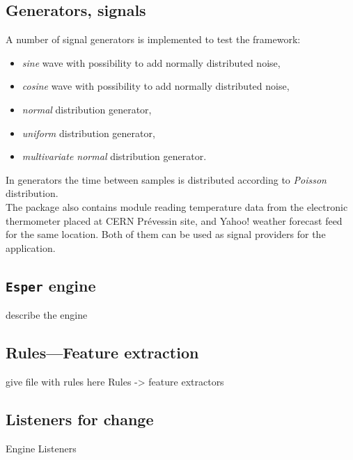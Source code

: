 \documentclass[11pt, letterpaper]{article}            %
\begin{document}
\subsection{Generators, signals}
A number of signal generators is implemented to test the framework:
\begin{itemize}
	\item \emph{sine} wave with possibility to add normally distributed noise,
	\item \emph{cosine} wave with possibility to add normally distributed noise,
	\item \emph{normal} distribution generator,
	\item \emph{uniform} distribution generator,
	\item \emph{multivariate normal} distribution generator.
\end{itemize}
In generators the time between samples is distributed according to \emph{Poisson} distribution.\\

The package also contains module reading temperature data from the electronic thermometer placed at CERN Prévessin site, and Yahoo! weather forecast feed for the same location. Both of them can be used as signal providers for the application.

\subsection{\texttt{Esper} engine}
describe the engine\\

\subsection{Rules---Feature extraction}
give file with rules here
Rules -> feature extractors\\

\subsection{Listeners for change}
Engine Listeners\\
\end{document}
